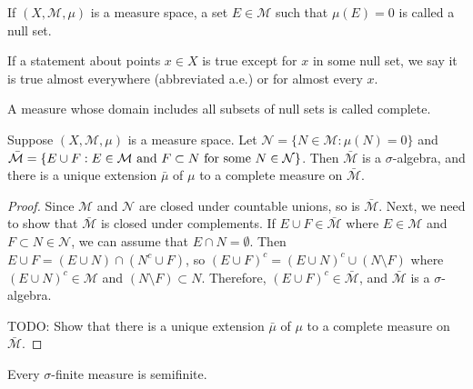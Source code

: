 \begin{definition}
    If $(X, \mathcal{M}, \mu)$ is a measure space, a set $E \in \mathcal{M}$ such that $\mu(E) = 0$ is called a null set.
\end{definition}

\begin{definition}
    If a statement about points $x \in X$ is true except for $x$ in some null set, we say it is true almost everywhere (abbreviated a.e.) or for almost every $x$.
\end{definition}

\begin{definition}
    A measure whose domain includes all subsets of null sets is called complete.
\end{definition}

\begin{theorem}
    Suppose $(X, \mathcal{M}, \mu)$ is a measure space.
    Let $\mathcal{N} = \{ N \in \mathcal{M}: \mu(N) = 0 \}$ and $\Bar{\mathcal{M}} = \{ E \cup F: E \in \mathcal{M} \text{ and } F \subset N \text{ for some } N \in \mathcal{N} \}$.
    Then $\bar{\mathcal{M}}$ is a $\sigma$-algebra, and there is a unique extension $\bar{\mu}$ of $\mu$ to a complete measure on $\bar{\mathcal{M}}$.
\end{theorem}

\begin{proof}
    Since $\mathcal{M}$ and $\mathcal{N}$ are closed under countable unions, so is $\bar{\mathcal{M}}$.
    Next, we need to show that $\bar{\mathcal{M}}$ is closed under complements.
    If $E \cup F \in \bar{\mathcal{M}}$ where $E \in \mathcal{M}$ and $F \subset N \in \mathcal{N}$, we can assume that $E \cap N = \emptyset$.
    Then $E \cup F = (E \cup N) \cap (N^c \cup F)$, so $(E \cup F)^c = (E \cup N)^c \cup (N \setminus F)$ where $(E \cup N)^c \in \mathcal{M}$ and $(N \setminus F) \subset N$.
    Therefore, $(E \cup F)^c \in \bar{\mathcal{M}}$, and $\bar{\mathcal{M}}$ is a $\sigma$-algebra.

    TODO: Show that there is a unique extension $\bar{\mu}$ of $\mu$ to a complete measure on $\bar{\mathcal{M}}$.
\end{proof}

\begin{proposition}
    Every $\sigma$-finite measure is semifinite.
\end{proposition}

